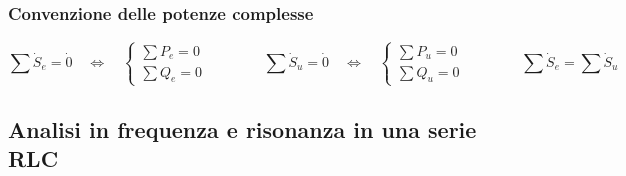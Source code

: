 \documentclass[a4paper]{article}
\begin{document}
\subsubsection*{Convenzione delle potenze complesse}
\[\sum \dot{S}_e = \dot{0} \quad \Leftrightarrow \quad \begin{cases}
	\sum P_e = 0 \\
	\sum Q_e = 0
\end{cases} \qquad \qquad \sum \dot{S}_u = \dot{0} \quad \Leftrightarrow \quad \begin{cases}
	\sum P_u = 0 \\
	\sum Q_u = 0
\end{cases} \qquad \qquad \sum \dot{S}_e = \sum \dot{S}_u\]

\newpage

\subsection{Analisi in frequenza e risonanza in una serie RLC}
\end{document}
